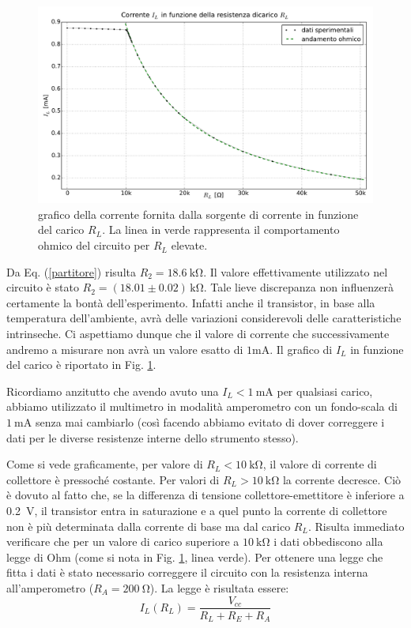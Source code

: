 \begin{figure}[H]
\centering
	\includegraphics[scale=0.45]{sorgente.pdf}
	\caption{grafico della corrente fornita dalla sorgente di corrente in funzione del carico $R_L$. La linea in verde rappresenta il comportamento ohmico del circuito per $R_L$ elevate.}
	\label{fig:sorg}
\end{figure}

Da Eq. (\ref{partitore}) risulta $R_2 = \SI{18.6}{\kilo\ohm} $.
Il valore effettivamente utilizzato nel circuito è stato $R_2 = (18.01 \pm 0.02 )\,\si{\kilo\ohm} $.
Tale lieve discrepanza non influenzerà certamente la bontà dell'esperimento.
Infatti anche il transistor, in base alla temperatura dell'ambiente, avrà delle variazioni considerevoli delle caratteristiche intrinseche.
Ci aspettiamo dunque che il valore di corrente che successivamente andremo a misurare non avrà un valore esatto di $1\si{\milli\ampere}$. 
Il grafico di $I_L$ in funzione del carico è riportato in Fig. \ref{fig:sorg}.

Ricordiamo anzitutto che avendo avuto una $I_L<\SI{1}{\milli\ampere}$ per qualsiasi carico, abbiamo utilizzato il multimetro in modalità amperometro con un fondo-scala di $\SI{1}{\milli\ampere}$ senza mai cambiarlo (così facendo abbiamo evitato di dover correggere i dati per le diverse resistenze interne dello strumento stesso).

Come si vede graficamente, per valore di $R_L<\SI{10}{\kilo\ohm}$, il valore di corrente di collettore è pressoché costante.
Per valori di $R_L>\SI{10}{\kilo\ohm}$ la corrente decresce.
Ciò è dovuto al fatto che, se la differenza di tensione collettore-emettitore è inferiore a \SI{0.2}{\volt}, il transistor entra in saturazione e a quel punto la corrente di  collettore non è più determinata dalla corrente di base ma dal carico $R_L$.
Risulta immediato verificare che  per un valore di carico superiore a $\SI{10}{\kilo\ohm}$ i dati obbediscono alla legge di Ohm (come si nota in Fig. \ref{fig:sorg}, linea verde).
Per ottenere una legge che fitta i dati è stato necessario correggere il circuito con la resistenza interna all'amperometro ($R_A = \SI{200}{\ohm}$).
La legge è risultata essere:
$$		I_L (R_L) =\frac{V_{cc}}{R_L+R_E+R_A}	$$